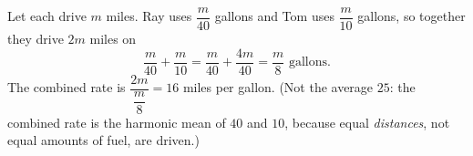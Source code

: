 Let each drive $m$ miles. Ray uses $\dfrac{m}{40}$ gallons and Tom uses $\dfrac{m}{10}$ gallons, so together they drive $2m$ miles on
\[\dfrac{m}{40}+\dfrac{m}{10}=\dfrac{m}{40}+\dfrac{4m}{40}=\dfrac{m}{8}\text{ gallons}.\]
The combined rate is $\dfrac{2m}{\dfrac {m}{8}}=\boxed{16}$ miles per gallon. (Not the average $25$: the combined rate is the harmonic mean of $40$ and $10$, because equal \emph{distances}, not equal amounts of fuel, are driven.)
